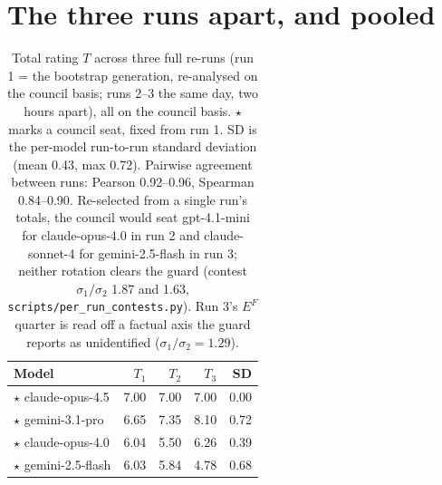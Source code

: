 \documentclass{article}
\begin{document}
\section{The three runs apart, and pooled}\label{the-three-runs-apart-and-pooled}

\begin{table}[H]
\caption{Total rating \(T\) across three full re-runs (run 1 = the bootstrap generation, re-analysed on the council basis; runs 2--3 the same day, two hours apart), all on the council basis. \ensuremath{\star} marks a council seat, fixed from run 1. SD is the per-model run-to-run standard deviation (mean 0.43, max 0.72). Pairwise agreement between runs: Pearson 0.92--0.96, Spearman 0.84--0.90. Re-selected from a single run's totals, the council would seat gpt-4.1-mini for claude-opus-4.0 in run 2 and claude-sonnet-4 for gemini-2.5-flash in run 3; neither rotation clears the guard (contest \(\sigma_1/\sigma_2\) 1.87 and 1.63, \protect\texttt{scripts/per\_\allowbreak{}run\_\allowbreak{}contests.py}). Run 3's \(E^{F}\) quarter is read off a factual axis the guard reports as unidentified (\(\sigma_1/\sigma_2 = 1.29\)).}
\label{tab-reruns}
\begin{center}\small
\begin{tabular}{@{}lrrrr@{}}
\toprule\noalign{}
Model & \(T_1\) & \(T_2\) & \(T_3\) & SD \\
\midrule\noalign{}
\ensuremath{\star} claude-opus-4.5 &\cellcolor[HTML]{2072B2}\textcolor[HTML]{EEF3F8}{7.00}&\cellcolor[HTML]{2072B2}\textcolor[HTML]{EEF3F8}{7.00}&\cellcolor[HTML]{2072B2}\textcolor[HTML]{EEF3F8}{7.00}&\cellcolor[HTML]{FFFFD9}\textcolor[HTML]{1A1A1A}{0.00} \\
\ensuremath{\star} gemini-3.1-pro &\cellcolor[HTML]{1F81B8}\textcolor[HTML]{EEF3F8}{6.65}&\cellcolor[HTML]{2164AB}\textcolor[HTML]{EEF3F8}{7.35}&\cellcolor[HTML]{234A9E}\textcolor[HTML]{EEF3F8}{8.10}&\cellcolor[HTML]{216AAE}\textcolor[HTML]{EEF3F8}{0.72} \\
\ensuremath{\star} claude-opus-4.0 &\cellcolor[HTML]{2397C1}\textcolor[HTML]{EEF3F8}{6.04}&\cellcolor[HTML]{33A7C2}\textcolor[HTML]{EEF3F8}{5.50}&\cellcolor[HTML]{1D91C0}\textcolor[HTML]{EEF3F8}{6.26}&\cellcolor[HTML]{78CABC}\textcolor[HTML]{1A1A1A}{0.39} \\
\ensuremath{\star} gemini-2.5-flash &\cellcolor[HTML]{2398C1}\textcolor[HTML]{EEF3F8}{6.03}&\cellcolor[HTML]{299DC1}\textcolor[HTML]{EEF3F8}{5.84}&\cellcolor[HTML]{4CBAC2}\textcolor[HTML]{1A1A1A}{4.78}&\cellcolor[HTML]{1F7BB5}\textcolor[HTML]{EEF3F8}{0.68} \\

\end{tabular}
\end{center}
\end{table}
\end{document}
